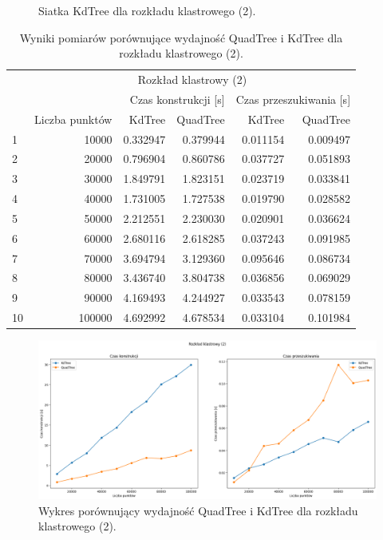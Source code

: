 \documentclass{lab}
\begin{document}
\begin{figure}[H]
\begin{minipage}{0.495\textwidth}
      \caption{Siatka KdTree dla rozkładu klastrowego (2).}
      \label{fig:cluster_KdTree_2}
  \end{minipage}
\end{figure}

\begin{table}[H]
\centering
\begin{tabular}{lrrrrr}
  \toprule
   & \multicolumn{5}{c}{Rozkład klastrowy (2)} \\
   &  & \multicolumn{2}{r}{Czas konstrukcji [s]} & \multicolumn{2}{r}{Czas przeszukiwania [s]} \\
   & Liczba punktów & KdTree & QuadTree & KdTree & QuadTree \\
  \midrule
1 & 10000 & 0.332947 & 0.379944 & 0.011154 & 0.009497 \\
2 & 20000 & 0.796904 & 0.860786 & 0.037727 & 0.051893 \\
3 & 30000 & 1.849791 & 1.823151 & 0.023719 & 0.033841 \\
4 & 40000 & 1.731005 & 1.727538 & 0.019790 & 0.028582 \\
5 & 50000 & 2.212551 & 2.230030 & 0.020901 & 0.036624 \\
6 & 60000 & 2.680116 & 2.618285 & 0.037243 & 0.091985 \\
7 & 70000 & 3.694794 & 3.129360 & 0.095646 & 0.086734 \\
8 & 80000 & 3.436740 & 3.804738 & 0.036856 & 0.069029 \\
9 & 90000 & 4.169493 & 4.244927 & 0.033543 & 0.078159 \\
10 & 100000 & 4.692992 & 4.678534 & 0.033104 & 0.101984 \\
  \bottomrule
  \end{tabular}
\caption{Wyniki pomiarów porównujące wydajność QuadTree i KdTree dla rozkładu klastrowego (2).}
\label{tab:cluster_time_2}
\end{table}

\begin{figure}[H]
  \centering
  \includegraphics[width=1\textwidth]{resources/cluster_graph_2.png}
  \caption{Wykres porównujący wydajność QuadTree i KdTree dla rozkładu klastrowego (2).}
  \label{fig:cluster_graph_2}
\end{figure}
\end{document}
